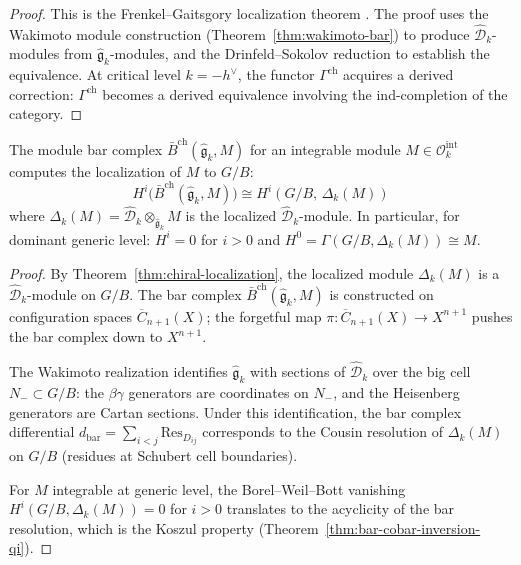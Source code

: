 \begin{proof}
This is the Frenkel--Gaitsgory localization theorem
\cite[Theorem~1]{FG06}.
The proof uses the Wakimoto module construction
(Theorem~\ref{thm:wakimoto-bar}) to produce
$\widehat{\mathcal{D}}_k$-modules from
$\widehat{\mathfrak{g}}_k$-modules, and the Drinfeld--Sokolov
reduction to establish the equivalence.  At critical level
$k = -h^\vee$, the functor $\Gamma^{\mathrm{ch}}$ acquires a
derived correction: $\Gamma^{\mathrm{ch}}$ becomes a derived
equivalence involving the ind-completion of the category.
\end{proof}

\begin{proposition}
\label{prop:bar-localization}
The module bar complex
$\bar{B}^{\mathrm{ch}}(\widehat{\mathfrak{g}}_k, M)$ for an
integrable module $M \in \mathcal{O}_k^{\mathrm{int}}$ computes the
localization of $M$ to $G/B$:
\begin{equation}\label{eq:bar-localization}
H^i\bigl(\bar{B}^{\mathrm{ch}}(\widehat{\mathfrak{g}}_k, M)\bigr)
\cong
H^i(G/B,\, \Delta_k(M))
\end{equation}
where $\Delta_k(M) = \widehat{\mathcal{D}}_k
\otimes_{\widehat{\mathfrak{g}}_k} M$ is the localized
$\widehat{\mathcal{D}}_k$-module.  In particular, for dominant
generic level: $H^i = 0$ for $i > 0$ and
$H^0 = \Gamma(G/B, \Delta_k(M)) \cong M$.
\end{proposition}

\begin{proof}
By Theorem~\ref{thm:chiral-localization}, the localized module
$\Delta_k(M)$ is a $\widehat{\mathcal{D}}_k$-module on $G/B$.
The bar complex $\bar{B}^{\mathrm{ch}}(\widehat{\mathfrak{g}}_k, M)$
is constructed on configuration spaces
$\overline{C}_{n+1}(X)$; the forgetful map
$\pi: \overline{C}_{n+1}(X) \to X^{n+1}$ pushes the bar complex
down to $X^{n+1}$.

The Wakimoto realization identifies $\widehat{\mathfrak{g}}_k$
with sections of $\widehat{\mathcal{D}}_k$ over the big cell
$N_- \subset G/B$: the $\beta\gamma$ generators are coordinates on
$N_-$, and the Heisenberg generators are Cartan sections.  Under this
identification, the bar complex differential
$d_{\mathrm{bar}} = \sum_{i<j} \mathrm{Res}_{D_{ij}}$ corresponds
to the Cousin resolution of $\Delta_k(M)$ on $G/B$ (residues at
Schubert cell boundaries).

For $M$ integrable at generic level, the Borel--Weil--Bott vanishing
$H^i(G/B, \Delta_k(M)) = 0$ for $i > 0$ translates to the acyclicity
of the bar resolution, which is the Koszul property
(Theorem~\ref{thm:bar-cobar-inversion-qi}).
\end{proof}

